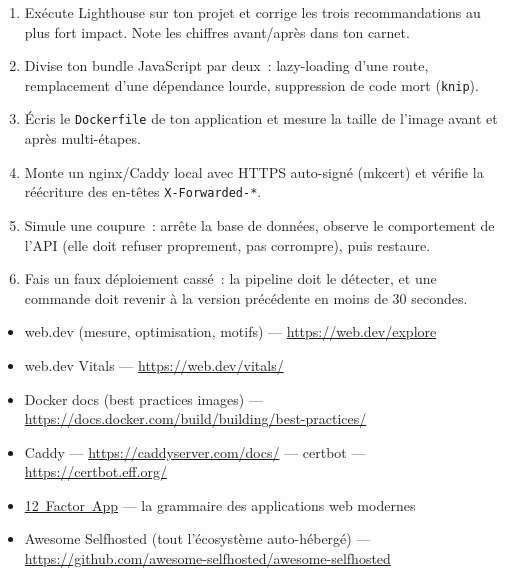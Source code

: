 \documentclass[12pt,a4paper,twoside,openright]{book}
\newcommand{\link}[2]{\href{#2}{#1}}
\begin{document}
\begin{exercice}
\begin{enumerate}
  \item Ex\'ecute Lighthouse sur ton projet et corrige les trois recommandations au plus fort
        impact. Note les chiffres avant/apr\`es dans ton carnet.
  \item Divise ton bundle JavaScript par deux~: lazy-loading d'une route, remplacement d'une
        d\'ependance lourde, suppression de code mort (\verb|knip|).
  \item \'Ecris le \verb|Dockerfile| de ton application et mesure la taille de l'image avant et
        apr\`es multi-\'etapes.
  \item Monte un nginx/Caddy local avec HTTPS auto-sign\'e (mkcert) et v\'erifie la r\'e\'ecriture
        des en-t\^etes \verb|X-Forwarded-*|.
  \item Simule une coupure~: arr\^ete la base de donn\'ees, observe le comportement de l'API
        (elle doit refuser proprement, pas corrompre), puis restaure.
  \item Fais un faux d\'eploiement cass\'e~: la pipeline doit le d\'etecter, et une commande doit
        revenir \`a la version pr\'ec\'edente en moins de 30 secondes.
\end{enumerate}
\end{exercice}

\begin{ressources}
\begin{itemize}
  \item web.dev (mesure, optimisation, motifs) --- \url{https://web.dev/explore}
  \item web.dev Vitals --- \url{https://web.dev/vitals/}
  \item Docker docs (best practices images) --- \url{https://docs.docker.com/build/building/best-practices/}
  \item Caddy --- \url{https://caddyserver.com/docs/} --- certbot --- \url{https://certbot.eff.org/}
  \item \link{12~Factor~App}{https://12factor.net/fr/} --- la grammaire des applications web modernes
  \item Awesome Selfhosted (tout l'\'ecosyst\`eme auto-h\'eberg\'e) --- \url{https://github.com/awesome-selfhosted/awesome-selfhosted}
\end{itemize}
\end{ressources}

\end{document}
